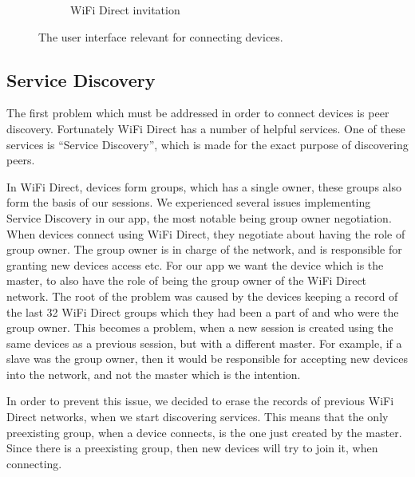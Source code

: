 \begin{figure}[ht]
\begin{subfigure}[b]{0.33\linewidth}
    \caption{WiFi Direct invitation}
    \label{fig:wifidirectinv}
    \vspace{4ex}
  \end{subfigure}
  \caption{The user interface relevant for connecting devices.}
  \label{fig:connecting}
\end{figure}

\subsection{Service Discovery}

The first problem which must be addressed in order to connect devices is peer discovery.
Fortunately WiFi Direct has a number of helpful services.
One of these services is ``Service Discovery'', which is made for the exact purpose of discovering peers.

In WiFi Direct, devices form groups, which has a single owner, these groups also form the basis of our sessions.
We experienced several issues implementing Service Discovery in our app, the most notable being group owner negotiation.
When devices connect using WiFi Direct, they negotiate about having the role of group owner.
The group owner is in charge of the network, and is responsible for granting new devices access etc.
For our app we want the device which is the master, to also have the role of being the group owner of the WiFi Direct network.
The root of the problem was caused by the devices keeping a record of the last 32 WiFi Direct groups which they had been a part of and who were the group owner.
This becomes a problem, when a new session is created using the same devices as a previous session, but with a different master.
For example, if a slave was the group owner, then it would be responsible for accepting new devices into the network, and not the master which is the intention.

In order to prevent this issue, we decided to erase the records of previous WiFi Direct networks, when we start discovering services.
This means that the only preexisting group, when a device connects, is the one just created by the master.
Since there is a preexisting group, then new devices will try to join it, when connecting.

